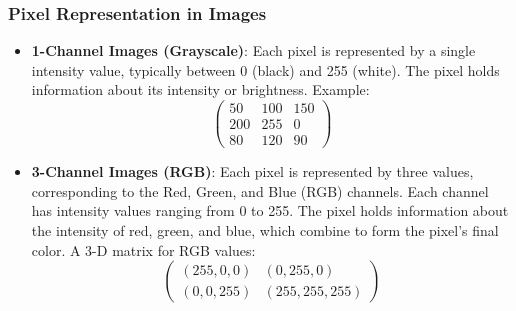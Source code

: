 \documentclass{beamer}
\begin{document}
\begin{frame}[plain]
    \frametitle{Pixel Representation in Images}
    \begin{itemize}
        \item \textbf{1-Channel Images (Grayscale)}: Each pixel is represented by a single intensity value, typically between 0 (black) and 255 (white). The pixel holds information about its intensity or brightness. 
        Example:
        \[
        \begin{pmatrix}
          50 & 100 & 150 \\
          200 & 255 & 0 \\
          80 & 120 & 90
        \end{pmatrix}
        \]
        \item \textbf{3-Channel Images (RGB)}: Each pixel is represented by three values, corresponding to the Red, Green, and Blue (RGB) channels. Each channel has intensity values ranging from 0 to 255. The pixel holds information about the intensity of red, green, and blue, which combine to form the pixel's final color. A 3-D matrix for RGB values:
        \[
        \begin{pmatrix}
          (255,0,0) & (0,255,0)\\
          (0,0,255) & (255,255,255)
        \end{pmatrix}
       
        \] 
    \end{itemize}
\end{frame}
\end{document}

